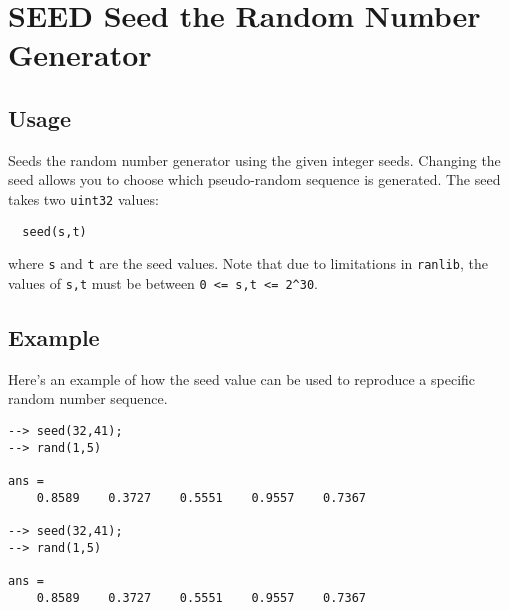 \section{SEED Seed the Random Number Generator}

\subsection{Usage}

Seeds the random number generator using the given integer seeds.  
Changing the seed allows you to choose which pseudo-random
sequence is generated.  The seed takes two \verb|uint32| values:
\begin{verbatim}
  seed(s,t)
\end{verbatim}
where \verb|s| and \verb|t| are the seed values.  Note that due to limitations
in \verb|ranlib|, the values of \verb|s,t| must be between \verb|0 <= s,t <= 2^30|.
\subsection{Example}

Here's an example of how the seed value can be used to reproduce
a specific random number sequence.
\begin{verbatim}
--> seed(32,41);
--> rand(1,5)

ans = 
    0.8589    0.3727    0.5551    0.9557    0.7367 

--> seed(32,41);
--> rand(1,5)

ans = 
    0.8589    0.3727    0.5551    0.9557    0.7367 
\end{verbatim}
